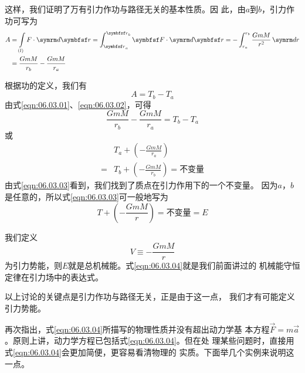 这样，我们证明了万有引力作功与路径无关的基本性质。因
此，由$ a $到$ b $，引力作功可写为
\begin{equation}\label{eqn:06.03.01}
 \begin{aligned}
 A &= \int \limits _{(l)} F \cdot \dif \vec{r} = \int _ { \vec{r}_a } ^ { \vec{r}_b } \vec{F} \cdot \dif \vec{r} = - \int _ { r _ a } ^ { r _ b } \frac { G m M } { r ^ { 2 } } \dif r \\
 & = \frac { G m M } { r _ { b } } - \frac { G m M } { r _ { a } }
 \end{aligned}
\end{equation}

根据功的定义，我们有
\begin{equation}\label{eqn:06.03.02}
 A = T _ { b } - T _ { a }
\end{equation}
由式\eqref{eqn:06.03.01}、\eqref{eqn:06.03.02}，可得
\begin{equation*}
 \frac { G m M } { r _ { b } } - \frac { G m M } { r _ { a } } = T _ { b } - T _ { a }
\end{equation*}
或
\begin{equation}\label{eqn:06.03.03}
 \begin{aligned}
 &T _ { a } + \left( - \frac { G m M } { r _ { a } } \right) \\
 =& T _ { b } + \left( - \frac { G m M } { r _ { b } } \right) = \text{不变量}
 \end{aligned}
\end{equation}
由式\eqref{eqn:06.03.03}看到，我们找到了质点在引力作用下的一个不变量。
因为$ a $，$ b $是任意的，所以式\eqref{eqn:06.03.03}可一般地写为
\begin{equation}\label{eqn:06.03.04}
 T + \left( - \frac { G m M } { r } \right) = \text{不变量} = E
\end{equation}

我们定义
\begin{equation}\label{eqn:06.03.05}
 V \equiv - \frac { G m M } { r }
\end{equation}
为引力势能，则$ E $就是总机械能。式\eqref{eqn:06.03.04}就是我们前面讲过的
机械能守恒定律在引力场中的表达式。

以上讨论的关键点是引力作功与路径无关，正是由于这一点，
我们才有可能定义引力势能。

再次指出，式\eqref{eqn:06.03.04}所描写的物理性质并没有超出动力学基
本方程$ \vec{F} = m \vec{a} $。原则上讲，动力学方程已包括式\eqref{eqn:06.03.04}。但在处
理某些问题时，直接用式\eqref{eqn:06.03.04}会更加简便，更容易看清物理的
实质。下面举几个实例来说明这一点。

